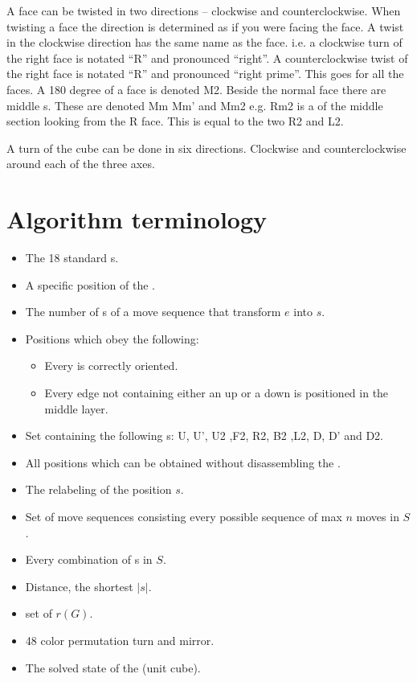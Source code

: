 A face can be twisted in two directions -- clockwise and counterclockwise. When twisting a face the direction is determined as if you were facing the face.
A twist in the clockwise direction has the same name as the face. i.e. a clockwise turn of the right face is notated ``R'' and pronounced ``right''.
A counterclockwise twist of the right face is notated ``R'' and pronounced ``right prime''. This goes for all the faces.
A 180 degree \twist{} of a face is denoted M2. 
Beside the normal face \twist{} there are middle \twist{}s. These are denoted Mm Mm' and Mm2 e.g. Rm2 is a \twist{} of the middle section looking from the R face. This \twist{} is equal to the two \twist{} R2 and L2.  

A turn of the cube can be done in six directions. Clockwise and counterclockwise around each of the three axes.

\section{Algorithm terminology}
\begin{itemize}
\item {}The 18 standard \twist{}s.
\item {}A specific position of the \rubik{}.
\item {}The number of \twist{}s of a move sequence that transform $e$ into $s$.
\item {}Positions which obey the following:
\begin{itemize}
	\item Every \cpiece{} is correctly oriented.
	\item Every edge \cpiece{} not containing either an up \facelet{} or a down \facelet{} is positioned in the middle layer.
\end{itemize}
\item {}Set containing the following \twist{}s: U, U', U2 ,F2, R2, B2 ,L2, D, D' and D2.
\item {}All positions which can be obtained without disassembling the \rubik{}. 
\item {}The relabeling of the position $s$.
\item {}Set of move sequences consisting every possible sequence of max $n$ moves in $S$.
\item {}Every combination of \twist{}s in $S$.
\item {}Distance, the shortest $|s|$.
\item {}set of $r(G)$.
\item {}48 color permutation turn and mirror.
\item {}The solved state of the \rubik{}(unit cube).
\end{itemize}


